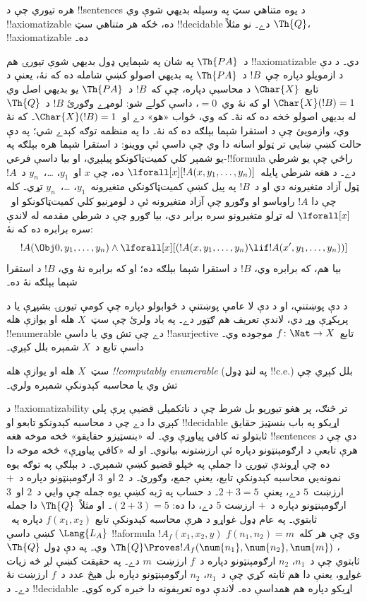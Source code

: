 \documentclass[../../../include/open-logic-section]{subfiles}
\begin{document}
\begin{ex}
هره تيوري چې د !!{sentence}s د يوه متناهي سټ په وسيله بديهي شوې وي
!!{axiomatizable} ده، ځکه هر متناهي سټ !!{decidable} دے۔ نو مثلاً
$\Th{Q}$، !!{axiomatizable} ده۔

د~$\Th{PA}$ په شان په شېمايي ډول بديهي شوې تيورۍ هم
!!{axiomatizable} دي۔ د دې د ازمويلو دپاره چې~$!B$ د~$\Th{PA}$ په
بديهي اصولو کښې شامله ده که نۀ، يعنې د تابع~$\Char{X}$ د محاسبې
دپاره، چې که~$!B$ د~$\Th{PA}$ يو بديهي اصل وي
$\Char{X}(!B) = 1$ او که نۀ وي~$=0$، داسې کولے شو: لومړے وګورئ
$!B$ د~$\Th{Q}$ له بديهي اصولو څخه ده که نۀ۔ که وي، ځواب «هو» دے
او~$\Char{X}(!B) = 1$۔ که نۀ وي، وازمويئ چې د استقرا شېما بېلګه ده
که نۀ۔ دا په منظمه توګه کېدے شي؛ په دې حالت کښې ښايي تر ټولو اسانه
دا وي چې داسې ئې ووينو: د استقرا شېما هره بېلګه په يو شمېر کلي
کميت‌ټاکونکو پيلېږي، او بيا داسې فرعي-!!{formula} راځي چې يو شرطي
دے۔ د هغه شرطي پايله~$\lforall[x][!A(x, y_1, \dots, y_n)]$ ده، چې
$x$ او~$y_1$، \dots،~$y_n$ د~$!A$ ټول آزاد متغيرونه دي او د~$!B$
په پيل کښې کميت‌ټاکونکي متغيرونه~$y_1$، \dots،~$y_n$ تړي۔ کله چې دا
$!A$ راوباسو او وګورو چې آزاد متغيرونه ئې د لومړنيو کلي
کميت‌ټاکونکو او~$\lforall[x]$ له تړلو متغيرونو سره برابر دي، بيا
ګورو چې د شرطي مقدمه له لاندې سره برابره ده که نۀ:
\[
!A(\Obj 0, y_1, \dots, y_n) \land \lforall[x][(!A(x, y_1, \dots, y_n)
\lif !A(x', y_1, \dots, y_n))]
\]
بيا هم، که برابره وي، $!B$ د استقرا شېما بېلګه ده؛ او که برابره نۀ
وي، $!B$ د استقرا شېما بېلګه نۀ ده۔
\end{ex}

د دې پوښتنې، او د دې لا عامې پوښتنې د ځوابولو دپاره چې کومې تيورۍ
بشپړې يا د پرېکړې وړ دي، لاندې تعريف هم ګټور دے۔ په ياد ولرئ چې سټ~$X$
هله او يوازې هله !!{enumerable} دے چې تش وي يا داسې !!a{surjective}
تابع~$f \colon \Nat \to X$ موجوده وي۔ داسې تابع د~$X$ شمېره بلل کېږي۔

\begin{defn}
سټ~$X$ هله او يوازې هله \emph{!!{computably enumerable}} (په لنډ ډول
!!{c.e.}) بلل کېږي چې تش وي يا محاسبه کېدونکې شمېره ولري۔
\end{defn}

د !!{axiomatizability} تر څنګ، پر هغو تيوريو بل شرط چې د ناتکميلۍ
قضيې پرې پلي کېږي دا دے چې د محاسبه کېدونکو تابعو او
!!{decidable} اړيکو په باب بنسټيز حقايق ثابتولو ته کافي پياوړې وي۔
له «بنسټيزو حقايقو» څخه موخه هغه !!{sentence}s دي چې د هرې تابعې د
ارګومېنټونو دپاره ئې ارزښتونه بيانوي۔ او له «کافي پياوړې» څخه موخه
دا ده چې اړوندې تيورۍ دا جملې په خپلو قضيو کښې شمېري۔ د بېلګې په
توګه يوه نمونه‌يي محاسبه کېدونکې تابع، يعنې جمع، وګورئ۔ د~$2$ او~$3$
ارګومېنټونو دپاره د~$+$ ارزښت~$5$ دے، يعنې~$2+3 = 5$۔ د حساب په
ژبه کښې يوه جمله چې وايي د~$2$ او~$3$ ارګومېنټونو دپاره د~$+$ ارزښت
$5$ دے، دا ده: $(\num{2} + \num{3}) = \num{5}$۔ او مثلاً~$\Th{Q}$
دا جمله ثابتوي۔ په عام ډول غواړو د هرې محاسبه کېدونکې تابع
$f(x_1, x_2)$ دپاره په~$\Lang{L_A}$ کښې داسې !!a{formula}
$!A_f(x_1, x_2, y)$ وي چې هر کله~$f(n_1, n_2) = m$،
$\Th{Q} \Proves !A_f(\num{n_1}, \num{n_2}, \num{m})$ وي۔ په دې ډول
$\Th{Q}$ ثابتوي چې د~$n_1$، $n_2$ ارګومېنټونو دپاره د~$f$ ارزښت~$m$
دے۔ په حقيقت کښې لږ څه زيات غواړو، يعنې دا هم ثابته کړي چې د~$n_1$،
$n_2$ ارګومېنټونو دپاره بل هېڅ عدد د~$f$ ارزښت نۀ دے۔ د
!!{decidable} اړيکو دپاره هم همداسې ده۔ لاندې دوه تعريفونه دا خبره
کره کوي۔
\end{document}
